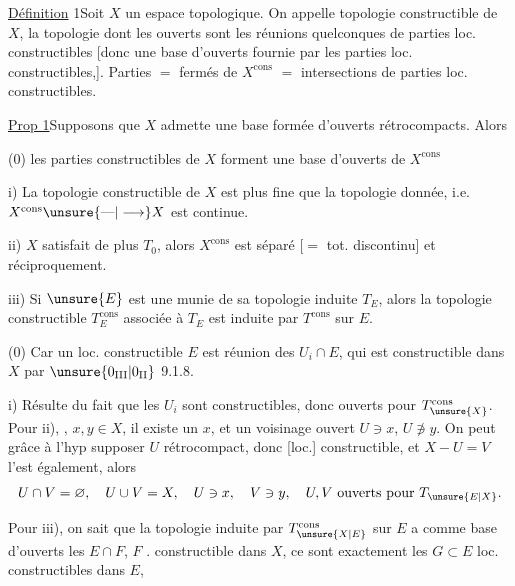 \uline{Définition} 1\quad Soit $X$ un espace topologique. On appelle topologie constructible de $X$,  la topologie dont les ouverts sont les réunions quelconques de parties loc. constructibles [donc une base d'ouverts fournie par les parties loc. constructibles,]. Parties  $=$ fermés de $X^{\mathrm{cons}}$ $=$ intersections de parties loc. constructibles.

\uline{Prop 1}\quad Supposons que  $X$ admette une base  formée d'ouverts rétrocompacts. Alors

(0) les parties constructibles de $X$ forment une base d'ouverts de $X^{\mathrm{cons}}$

i) La topologie constructible de $X$ est plus fine que la topologie donnée, i.e. $X^{\mathrm{cons}}\unsure{\text{---}|\longrightarrow}X$ est continue.

ii)  $X$ satisfait de plus $T_0$, alors $X^{\mathrm{cons}}$ est séparé [$=$ tot. discontinu] et réciproquement.

iii) Si $\unsure{E}$ est une  munie de sa topologie induite $T_E$, alors la topologie constructible $T_E^{\mathrm{cons}}$ associée à $T_E$ est induite par $T^{\mathrm{cons}}$ sur $E$.


(0) Car un loc. constructible $E$ est réunion des $U_i\cap E$, qui est constructible dans $X$ par $\unsure{0_{\mathrm{III}}|0_{\mathrm{II}}}$ 9.1.8.

i) Résulte du fait que les $U_i$ sont \inserted{[loc]} constructibles, donc ouverts pour $T_{\unsure{X}}^{\mathrm{cons}}$. Pour ii), , $x,y\in X$, il existe un  $x$, et un voisinage ouvert $U\ni x$, $U\not\ni y$. On peut grâce à l'hyp supposer $U$ rétrocompact, donc [loc.] constructible, et $X-U=V$ l'est  également, alors
\[
U\cap V=\varnothing,\quad U\cup V=X,\quad U\ni x,\quad V\ni y,\quad U,V\text{ ouverts pour }T_{\unsure{E|X}}.
\]

Pour iii), on sait que la topologie induite par $T_{\unsure{X|E}}^{\mathrm{cons}}$ sur $E$ a comme base d'ouverts les $E\cap F$, $F$ . constructible dans $X$, ce sont exactement les $G\subset E$ loc. constructibles dans $E$,

